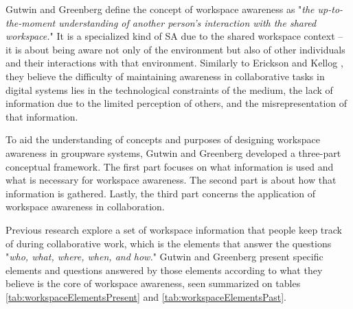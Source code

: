     Gutwin and Greenberg \cite{gutwinDescriptiveFrameworkWorkspace2002} define the concept of workspace awareness as "\textit{the up-to-the-moment understanding of another person's interaction with the shared workspace.}" It is a specialized kind of SA due to the shared workspace context -- it is about being aware not only of the environment but also of other individuals and their interactions with that environment. Similarly to Erickson and Kellog \cite{ericksonSocialTranslucenceApproach2000}, they believe the difficulty of maintaining awareness in collaborative tasks in digital systems lies in the technological constraints of the medium, the lack of information due to the limited perception of others, and the misrepresentation of that information.

    To aid the understanding of concepts and purposes of designing workspace awareness in groupware systems, Gutwin and Greenberg \cite{gutwinDescriptiveFrameworkWorkspace2002} developed a three-part conceptual framework. The first part focuses on what information is used and what is necessary for workspace awareness. The second part is about how that information is gathered. Lastly, the third part concerns the application of workspace awareness in collaboration.

    Previous research \cite{dourishAwarenessCoordinationShared1992, sohlenkampIntegratingCommunicationCooperation1994, mcdanielAwarenessCollaborativeSystems1997, gutwinDescriptiveFrameworkWorkspace2002} explore a set of workspace information that people keep track of during collaborative work, which is the elements that answer the questions "\textit{who, what, where, when, and how.}" Gutwin and Greenberg \cite{gutwinDescriptiveFrameworkWorkspace2002} present specific elements and questions answered by those elements according to what they believe is the core of workspace awareness, seen summarized on tables \ref{tab:workspaceElementsPresent} and \ref{tab:workspaceElementsPast}.

